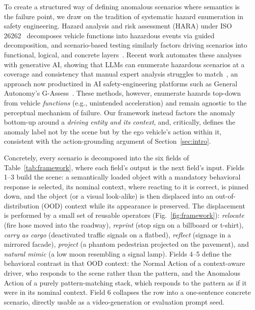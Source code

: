 \documentclass[conference]{IEEEtran}
\begin{document}
To create a structured way of defining anomalous scenarios where semantics is the failure point, we draw on the tradition of systematic hazard enumeration in safety engineering. Hazard analysis and risk assessment (HARA) under ISO 26262~\cite{b20} decomposes vehicle functions into hazardous events via guided decomposition, and scenario-based testing similarly factors driving scenarios into functional, logical, and concrete layers~\cite{b21}. Recent work automates these analyses with generative AI, showing that LLMs can enumerate hazardous scenarios at a coverage and consistency that manual expert analysis struggles to match~\cite{b22}, an approach now productized in AI safety-engineering platforms such as General Autonomy's G-Assess~\cite{b23}. These methods, however, enumerate hazards top-down from vehicle \emph{functions} (e.g., unintended acceleration) and remain agnostic to the perceptual mechanism of failure. Our framework instead factors the anomaly bottom-up around a \emph{driving entity and its context}, and, critically, defines the anomaly label not by the scene but by the ego vehicle's action within it, consistent with the action-grounding argument of Section~\ref{sec:intro}.

Concretely, every scenario is decomposed into the six fields of Table~\ref{tab:framework}, where each field's output is the next field's input. Fields 1--3 build the scene: a semantically loaded object with a mandatory behavioral response is selected, its nominal context, where reacting to it is correct, is pinned down, and the object (or a visual look-alike) is then displaced into an out-of-distribution (OOD) context while its appearance is preserved. The displacement is performed by a small set of reusable operators (Fig.~\ref{fig:framework}): \emph{relocate} (fire hose moved into the roadway), \emph{reprint} (stop sign on a billboard or t-shirt), \emph{carry as cargo} (deactivated traffic signals on a flatbed), \emph{reflect} (signage in a mirrored facade), \emph{project} (a phantom pedestrian projected on the pavement), and \emph{natural mimic} (a low moon resembling a signal lamp). Fields 4--5 define the behavioral contrast in that OOD context: the Normal Action of a context-aware driver, who responds to the scene rather than the pattern, and the Anomalous Action of a purely pattern-matching stack, which responds to the pattern as if it were in its nominal context. Field 6 collapses the row into a one-sentence concrete scenario, directly usable as a video-generation or evaluation prompt seed.
\end{document}
